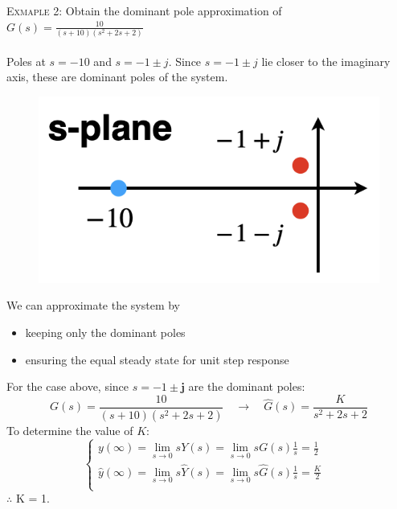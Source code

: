 \documentclass[12pt,a4paper]{article}
\begin{document}
\begin{tcolorbox}[breakable]
\textsc{Exmaple 2:} Obtain the dominant pole approximation of $G(s) = \frac{10}{(s+10)(s^{2}+2s+2)}$\\\\
Poles at $s=-10$ and $s = -1\pm j$. Since $s = -1\pm j$ lie closer to the imaginary axis, these are dominant poles of the system.
\begin{figure}[H] \centering 
\includegraphics[width=.3\textwidth]{images/4ex2.png}
\end{figure}
We can approximate the system by 
\begin{itemize}
\item keeping only the dominant poles
\item ensuring the equal steady state for unit step response
\end{itemize}
For the case above, since $s = -1\pm \mathbf{j}$ are the dominant poles:
\[ G(s) = \frac{10}{(s+10)(s^{2}+2s+2)} \quad \to \quad \hat{G}(s) =\frac{K}{s^{2}+2s+2}\]
To determine the value of $K$:
\[\begin{cases}
y(\infty) = \lim_{s\to0}sY(s) = \lim_{s\to0}sG(s)\frac{1}{s} = \frac{1}{2} \quad \\
\hat{y}(\infty) = \lim_{s\to0}s\hat{Y}(s) = \lim_{s\to0}s\hat{G}(s)\frac{1}{s} = \frac{K}{2}\\
\end{cases}\]
$\therefore$ \quad K = 1.
\end{tcolorbox}
\end{document}
